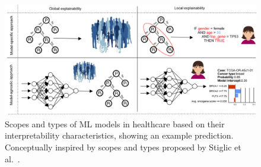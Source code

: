 \begin{figure}[h]
	\centering
	\includegraphics[scale=0.7]{images/lvg_cancer.png}	
    \caption[Scopes and types of ML models in healthcare]{Scopes and types of ML models in healthcare based on their interpretability characteristics, showing an example prediction. Conceptually inspired by scopes and types proposed by Stiglic et al.~\cite{stiglic2020interpretability}.}	
	\label{fig:local_vs_global_ex}
\end{figure}



